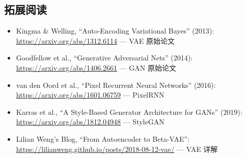 \documentclass[a4paper]{article}
\begin{document}
\subsection{拓展阅读}

\begin{itemize}
    \item Kingma \& Welling, ``Auto-Encoding Variational Bayes'' (2013): \url{https://arxiv.org/abs/1312.6114} --- VAE 原始论文
    \item Goodfellow et al., ``Generative Adversarial Nets'' (2014): \url{https://arxiv.org/abs/1406.2661} --- GAN 原始论文
    \item van den Oord et al., ``Pixel Recurrent Neural Networks'' (2016): \url{https://arxiv.org/abs/1601.06759} --- PixelRNN
    \item Karras et al., ``A Style-Based Generator Architecture for GANs'' (2019): \url{https://arxiv.org/abs/1812.04948} --- StyleGAN
    \item Lilian Weng's Blog, ``From Autoencoder to Beta-VAE'': \url{https://lilianweng.github.io/posts/2018-08-12-vae/} --- VAE 详解
\end{itemize}
\end{document}
